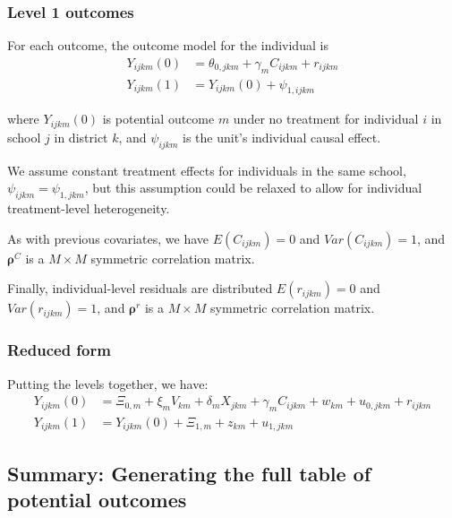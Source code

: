 \documentclass[12pt]{article}
\newcommand\mb[1]{\boldsymbol{#1}}
\begin{document}
\subsubsection{Level 1 outcomes}

For each outcome, the outcome model for the individual is
\begin{align}
Y_{ijkm}(0) &= \theta_{0,jkm} + \gamma_m C_{ijkm} + r_{ijkm} \\
Y_{ijkm}(1) &= Y_{ijkm}(0) + \psi_{1,ijkm}
\end{align}

where $Y_{ijkm}(0)$ is potential outcome $m$ under no treatment for individual $i$ in school $j$ in district $k$, and $\psi_{ijkm}$ is the unit's individual causal effect.

We assume constant treatment effects for individuals in the same school, $\psi_{ijkm} = \psi_{1,jkm}$, but this assumption could be relaxed to allow for individual treatment-level heterogeneity.

As with previous covariates, we have $E(C_{ijkm}) = 0$ and $Var(C_{ijkm}) = 1$, and $\mb{\rho}^C$ is a $M \times M$ symmetric correlation matrix.

Finally, individual-level residuals are distributed $E(r_{ijkm}) = 0$ and $Var(r_{ijkm}) = 1$, and $\mb{\rho}^r$ is a $M \times M$ symmetric correlation matrix.

\subsubsection{Reduced form}

Putting the levels together, we have:
\begin{align}\label{eq:reduced}
Y_{ijkm}(0) &= \Xi_{0,m} + \xi_{m} V_{km} + \delta_{m} X_{jkm} + \gamma_m C_{ijkm} + w_{km} + u_{0,jkm} + r_{ijkm} \\
Y_{ijkm}(1) &= Y_{ijkm}(0) + \Xi_{1,m} + z_{km} + u_{1,jkm}
\end{align}



\subsection{Summary: Generating the full table of potential outcomes}
\end{document}
